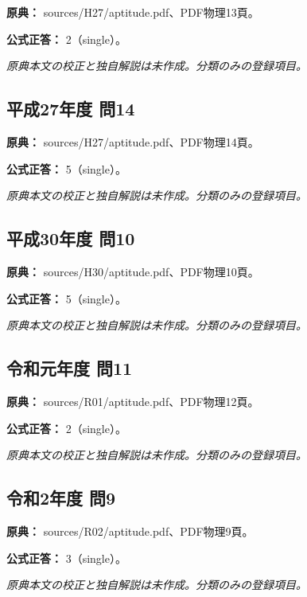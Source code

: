 \noindent\textbf{原典：} sources/H27/aptitude.pdf、PDF物理13頁。

\textbf{公式正答：} 2（single）。

\par\textit{原典本文の校正と独自解説は未作成。分類のみの登録項目。}

\subsection{平成27年度 問14}
\label{q:h27-reg-apt-14}

\noindent\textbf{原典：} sources/H27/aptitude.pdf、PDF物理14頁。

\textbf{公式正答：} 5（single）。

\par\textit{原典本文の校正と独自解説は未作成。分類のみの登録項目。}

\subsection{平成30年度 問10}
\label{q:h30-reg-apt-10}

\noindent\textbf{原典：} sources/H30/aptitude.pdf、PDF物理10頁。

\textbf{公式正答：} 5（single）。

\par\textit{原典本文の校正と独自解説は未作成。分類のみの登録項目。}

\subsection{令和元年度 問11}
\label{q:r01-reg-apt-11}

\noindent\textbf{原典：} sources/R01/aptitude.pdf、PDF物理12頁。

\textbf{公式正答：} 2（single）。

\par\textit{原典本文の校正と独自解説は未作成。分類のみの登録項目。}

\subsection{令和2年度 問9}
\label{q:r02-reg-apt-09}

\noindent\textbf{原典：} sources/R02/aptitude.pdf、PDF物理9頁。

\textbf{公式正答：} 3（single）。

\par\textit{原典本文の校正と独自解説は未作成。分類のみの登録項目。}

